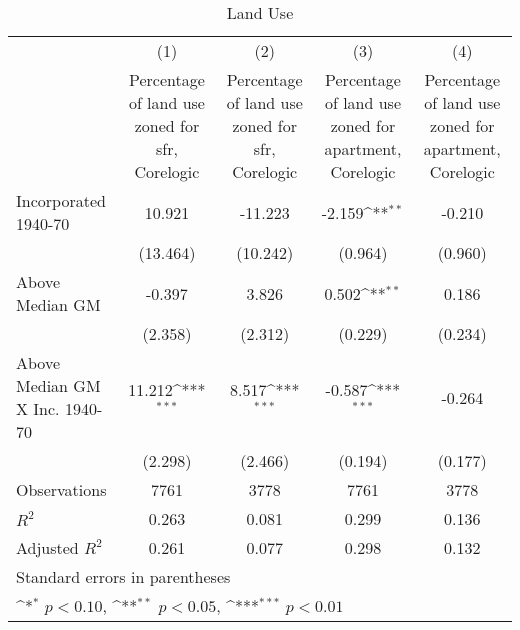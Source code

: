 \begin{table}[htbp]\centering
\def\sym#1{\ifmmode^{#1}\else\(^{#1}\)\fi}
\caption{Land Use}
\begin{tabular}{l*{4}{c}}
\hline\hline
                    &\multicolumn{1}{c}{(1)}&\multicolumn{1}{c}{(2)}&\multicolumn{1}{c}{(3)}&\multicolumn{1}{c}{(4)}\\
                    &\multicolumn{1}{c}{Percentage of land use zoned for sfr, Corelogic}&\multicolumn{1}{c}{Percentage of land use zoned for sfr, Corelogic}&\multicolumn{1}{c}{Percentage of land use zoned for apartment, Corelogic}&\multicolumn{1}{c}{Percentage of land use zoned for apartment, Corelogic}\\
\hline
Incorporated 1940-70&      10.921         &     -11.223         &      -2.159\sym{**} &      -0.210         \\
                    &    (13.464)         &    (10.242)         &     (0.964)         &     (0.960)         \\
[1em]
Above Median GM     &      -0.397         &       3.826         &       0.502\sym{**} &       0.186         \\
                    &     (2.358)         &     (2.312)         &     (0.229)         &     (0.234)         \\
[1em]
Above Median GM X Inc. 1940-70&      11.212\sym{***}&       8.517\sym{***}&      -0.587\sym{***}&      -0.264         \\
                    &     (2.298)         &     (2.466)         &     (0.194)         &     (0.177)         \\
\hline
Observations        &        7761         &        3778         &        7761         &        3778         \\
\(R^{2}\)           &       0.263         &       0.081         &       0.299         &       0.136         \\
Adjusted \(R^{2}\)  &       0.261         &       0.077         &       0.298         &       0.132         \\
\hline\hline
\multicolumn{5}{l}{\footnotesize Standard errors in parentheses}\\
\multicolumn{5}{l}{\footnotesize \sym{*} \(p<0.10\), \sym{**} \(p<0.05\), \sym{***} \(p<0.01\)}\\
\end{tabular}
\end{table}
